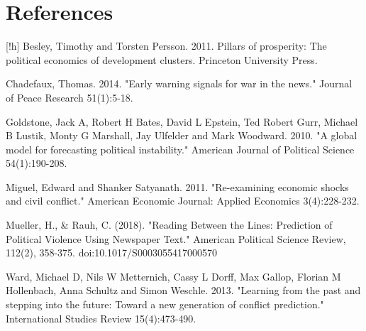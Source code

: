 \clearpage

\newpage

\section*{References}[!h]
Besley, Timothy and Torsten Persson. 2011. Pillars of prosperity: The political economics \newline \indent of development clusters. Princeton University Press.\vspace{0.25cm}

\noindent Chadefaux, Thomas. 2014. "Early warning signals for war in the news." Journal of Peace \newline \indent Research 51(1):5-18.\vspace{0.25cm}

\noindent Goldstone, Jack A, Robert H Bates, David L Epstein, Ted Robert Gurr, Michael B Lustik, \newline \indent Monty G Marshall, Jay Ulfelder and Mark Woodward. 2010. "A global model for \newline \indent forecasting political instability." American Journal of Political Science 54(1):190-208.\vspace{0.25cm}

\noindent Miguel, Edward and Shanker Satyanath. 2011. "Re-examining economic shocks and civil \newline \indent conflict." American Economic Journal: Applied Economics 3(4):228-232.\vspace{0.25cm}

\noindent Mueller, H., \& Rauh, C. (2018). "Reading Between the Lines: Prediction of Political \newline \indent Violence Using Newspaper Text." American Political Science Review, 112(2), 358-375. \newline \indent doi:10.1017/S0003055417000570\vspace{0.25cm}

\noindent Ward, Michael D, Nils W Metternich, Cassy L Dorff, Max Gallop, Florian M Hollenbach, \newline \indent Anna Schultz and Simon Weschle. 2013. "Learning from the past and stepping into \newline \indent the future: Toward a new generation of conflict prediction." International Studies \newline \indent Review 15(4):473-490.

\clearpage

